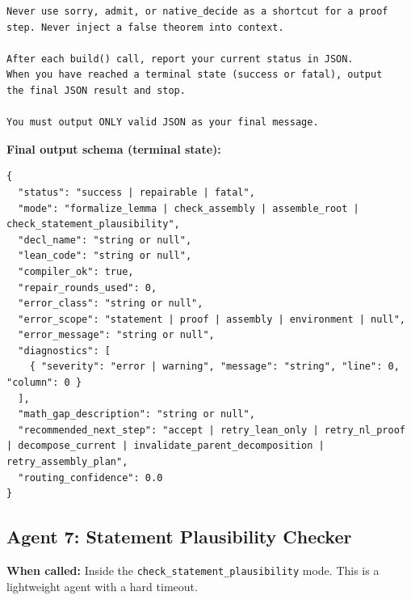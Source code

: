\documentclass[11pt,a4paper]{article}
\begin{document}
\begin{promptbox}
\begin{lstlisting}[language=prompt]
Never use sorry, admit, or native_decide as a shortcut for a proof
step. Never inject a false theorem into context.

After each build() call, report your current status in JSON.
When you have reached a terminal state (success or fatal), output
the final JSON result and stop.

You must output ONLY valid JSON as your final message.
\end{lstlisting}
\end{promptbox}

\textbf{Final output schema (terminal state):}
\begin{lstlisting}
{
  "status": "success | repairable | fatal",
  "mode": "formalize_lemma | check_assembly | assemble_root | check_statement_plausibility",
  "decl_name": "string or null",
  "lean_code": "string or null",
  "compiler_ok": true,
  "repair_rounds_used": 0,
  "error_class": "string or null",
  "error_scope": "statement | proof | assembly | environment | null",
  "error_message": "string or null",
  "diagnostics": [
    { "severity": "error | warning", "message": "string", "line": 0, "column": 0 }
  ],
  "math_gap_description": "string or null",
  "recommended_next_step": "accept | retry_lean_only | retry_nl_proof | decompose_current | invalidate_parent_decomposition | retry_assembly_plan",
  "routing_confidence": 0.0
}
\end{lstlisting}

\subsection{Agent 7: Statement Plausibility Checker}

\textbf{When called:} Inside the \texttt{check\_statement\_plausibility} mode. This is a lightweight agent with a hard timeout.
\end{document}
